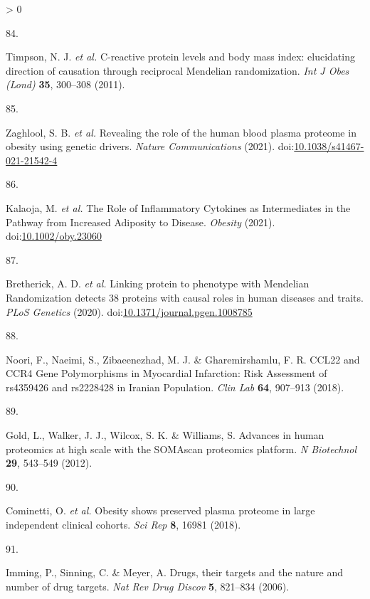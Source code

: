 \documentclass[11pt,twoside]{bristolthesis}
\newlength{\cslhangindent}
\newlength{\csllabelwidth}
\newenvironment{CSLReferences}[2] %
 {%
  \setlength{\parindent}{0pt}
  \ifodd #1 \everypar{\setlength{\hangindent}{\cslhangindent}}\ignorespaces\fi
  \ifnum #2 > 0
  \setlength{\parskip}{#2\baselineskip}
  \fi
 }%
 {}
\newcommand{\CSLLeftMargin}[1]{\parbox[t]{\csllabelwidth}{#1}}
\newcommand{\CSLRightInline}[1]{\parbox[t]{\linewidth - \csllabelwidth}{#1}\break}
\begin{document}
\begin{CSLReferences}{0}{0}
\leavevmode\hypertarget{ref-Timpson2011}{}%
\CSLLeftMargin{84. }
\CSLRightInline{Timpson, N. J. \emph{et al.} {C-reactive protein levels and body mass index: elucidating direction of causation through reciprocal Mendelian randomization}. \emph{Int J Obes (Lond)} \textbf{35}, 300--308 (2011).}

\leavevmode\hypertarget{ref-Zaghlool2021}{}%
\CSLLeftMargin{85. }
\CSLRightInline{Zaghlool, S. B. \emph{et al.} {Revealing the role of the human blood plasma proteome in obesity using genetic drivers}. \emph{Nature Communications} (2021). doi:\href{https://doi.org/10.1038/s41467-021-21542-4}{10.1038/s41467-021-21542-4}}

\leavevmode\hypertarget{ref-Kalaoja2021}{}%
\CSLLeftMargin{86. }
\CSLRightInline{Kalaoja, M. \emph{et al.} {The Role of Inflammatory Cytokines as Intermediates in the Pathway from Increased Adiposity to Disease}. \emph{Obesity} (2021). doi:\href{https://doi.org/10.1002/oby.23060}{10.1002/oby.23060}}

\leavevmode\hypertarget{ref-Bretherick2020}{}%
\CSLLeftMargin{87. }
\CSLRightInline{Bretherick, A. D. \emph{et al.} {Linking protein to phenotype with Mendelian Randomization detects 38 proteins with causal roles in human diseases and traits}. \emph{PLoS Genetics} (2020). doi:\href{https://doi.org/10.1371/journal.pgen.1008785}{10.1371/journal.pgen.1008785}}

\leavevmode\hypertarget{ref-Noori2018}{}%
\CSLLeftMargin{88. }
\CSLRightInline{Noori, F., Naeimi, S., Zibaeenezhad, M. J. \& Gharemirshamlu, F. R. {CCL22 and CCR4 Gene Polymorphisms in Myocardial Infarction: Risk Assessment of rs4359426 and rs2228428 in Iranian Population}. \emph{Clin Lab} \textbf{64}, 907--913 (2018).}

\leavevmode\hypertarget{ref-Gold2012}{}%
\CSLLeftMargin{89. }
\CSLRightInline{Gold, L., Walker, J. J., Wilcox, S. K. \& Williams, S. {Advances in human proteomics at high scale with the SOMAscan proteomics platform}. \emph{N Biotechnol} \textbf{29}, 543--549 (2012).}

\leavevmode\hypertarget{ref-Cominetti2018}{}%
\CSLLeftMargin{90. }
\CSLRightInline{Cominetti, O. \emph{et al.} {Obesity shows preserved plasma proteome in large independent clinical cohorts}. \emph{Sci Rep} \textbf{8}, 16981 (2018).}

\leavevmode\hypertarget{ref-Imming2006}{}%
\CSLLeftMargin{91. }
\CSLRightInline{Imming, P., Sinning, C. \& Meyer, A. {Drugs, their targets and the nature and number of drug targets}. \emph{Nat Rev Drug Discov} \textbf{5}, 821--834 (2006).}


\end{CSLReferences}
\end{document}

